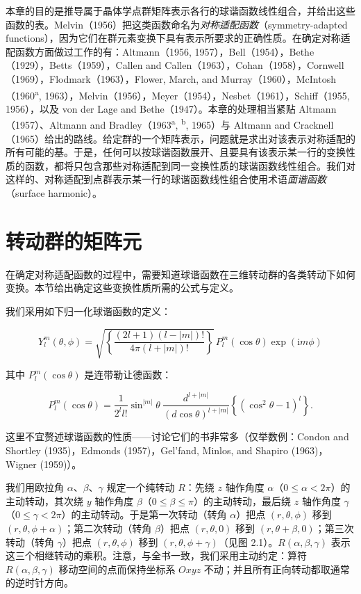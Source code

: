 
本章的目的是推导属于晶体学点群矩阵表示各行的球谐函数线性组合，并给出这些函数的表。Melvin（1956）把这类函数命名为\textit{对称适配函数}（symmetry-adapted functions），因为它们在群元素变换下具有表示所要求的正确性质。在确定对称适配函数方面做过工作的有：Altmann（1956, 1957），Bell（1954），Bethe（1929），Betts（1959），Callen and Callen（1963），Cohan（1958），Cornwell（1969），Flodmark（1963），Flower, March, and Murray（1960），McIntosh（1960\textsuperscript{a}, 1963），Melvin（1956），Meyer（1954），Nesbet（1961），Schiff（1955, 1956），以及 von der Lage and Bethe（1947）。本章的处理相当紧贴 Altmann（1957）、Altmann and Bradley（1963\textsuperscript{a}, \textsuperscript{b}, 1965）与 Altmann and Cracknell（1965）给出的路线。给定群的一个矩阵表示，问题就是求出对该表示对称适配的所有可能的基。于是，任何可以按球谐函数展开、且要具有该表示某一行的变换性质的函数，都将只包含那些对称适配到同一变换性质的球谐函数线性组合。我们对这样的、对称适配到点群表示某一行的球谐函数线性组合使用术语\textit{面谐函数}（surface harmonic）。

\section{转动群的矩阵元}

在确定对称适配函数的过程中，需要知道球谐函数在三维转动群的各类转动下如何变换。本节给出确定这些变换性质所需的公式与定义。

我们采用如下归一化球谐函数的定义：

\begin{equation*}
Y_{l}^{m}(\theta, \phi) = \sqrt{\left\{\frac{(2l+1)(l-|m|)!}{4\pi(l+|m|)!}\right\}}\, P_{l}^{m}(\cos\theta)\exp(\mathrm{i}m\phi)
\tag{2.1.1}
\end{equation*}

其中 $P_{l}^{m}(\cos\theta)$ 是连带勒让德函数：

\begin{equation*}
P_{l}^{m}(\cos\theta) = \frac{1}{2^{l}l!}\sin^{|m|}\theta\ \frac{d^{l+|m|}}{(d\cos\theta)^{l+|m|}}\left\{(\cos^{2}\theta - 1)^{l}\right\}.
\tag{2.1.2}
\end{equation*}

这里不宜赘述球谐函数的性质——讨论它们的书非常多（仅举数例：Condon and Shortley (1935)，Edmonds (1957)，Gel'fand, Minlos, and Shapiro (1963)，Wigner (1959)）。

我们用欧拉角 $\alpha$、$\beta$、$\gamma$ 规定一个纯转动 $R$：先绕 $z$ 轴作角度 $\alpha$（$0 \leqslant \alpha < 2\pi$）的主动转动，其次绕 $y$ 轴作角度 $\beta$（$0 \leqslant \beta \leqslant \pi$）的主动转动，最后绕 $z$ 轴作角度 $\gamma$（$0 \leqslant \gamma < 2\pi$）的主动转动。于是第一次转动（转角 $\alpha$）把点 $(r, \theta, \phi)$ 移到 $(r, \theta, \phi + \alpha)$；第二次转动（转角 $\beta$）把点 $(r, \theta, 0)$ 移到 $(r, \theta + \beta, 0)$；第三次转动（转角 $\gamma$）把点 $(r, \theta, \phi)$ 移到 $(r, \theta, \phi + \gamma)$（见图 2.1）。$R(\alpha, \beta, \gamma)$ 表示这三个相继转动的乘积。注意，与全书一致，我们采用主动约定：算符 $R(\alpha, \beta, \gamma)$ 移动空间的点而保持坐标系 $Oxyz$ 不动；并且所有正向转动都取通常的逆时针方向。


